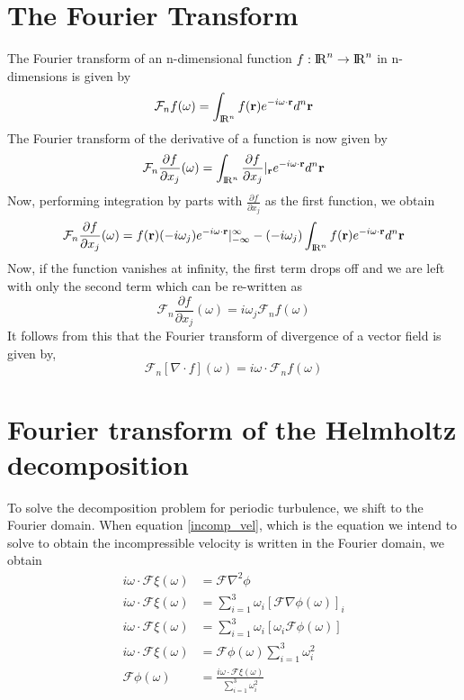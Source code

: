 \documentclass[12pt, a4paper]{report}
\begin{document}
\section{The Fourier Transform}

The Fourier transform of an n-dimensional function $f:{\rm I\!R}^n \rightarrow {\rm I\!R}^n$ in n-dimensions is given by
\begin{equation}
    \mathcal{F}_nf(\omega) = \int_{{\rm I\!R}^n}{f(\mathbf{r})e^{-i\omega\cdot\mathbf{r}}d^n\mathbf{r}}
\end{equation}
The Fourier transform of the derivative of a function is now given by
\begin{equation}
    \mathcal{F}_n\frac{\partial f}{\partial x_j}(\omega) = \int_{{\rm I\!R}^n}{\frac{\partial f}{\partial x_j}|_\mathbf{r} e^{-i\omega\cdot\mathbf{r}}d^n\mathbf{r}}
\end{equation}
Now, performing integration by parts with $\frac{\partial f}{\partial x_j}$ as the first function, we obtain
\begin{equation}
    \mathcal{F}_n\frac{\partial f}{\partial x_j}(\omega) = f(\mathbf{r})(-i\omega_j)e^{-i\omega\cdot\mathbf{r}}|_{-\infty}^{\infty} - (-i\omega_j)\int_{{\rm I\!R}^n}{f(\mathbf{r})e^{-i\omega\cdot\mathbf{r}}d^n\mathbf{r}}
\end{equation}
Now, if the function vanishes at infinity, the first term drops off and we are left with only the second term which can be re-written as
\begin{equation}\label{ft derivative}
    \mathcal{F}_n\frac{\partial f}{\partial x_j}(\omega) = i\omega_j\mathcal{F}_nf(\omega)
\end{equation}
It follows from this that the Fourier transform of divergence of a vector field is given by,
\begin{equation}
    \mathcal{F}_n[\nabla\cdot{f}](\omega) = i\omega\cdot\mathcal{F}_nf(\omega)
\end{equation}

\section{Fourier transform of the Helmholtz decomposition}
To solve the decomposition problem for periodic turbulence, we shift to the Fourier domain. When equation \ref{incomp_vel}, which is the equation we intend to solve to obtain the incompressible velocity is written in the Fourier domain, we obtain
\begin{align}
     i\omega\cdot\mathcal{F}\xi(\omega) &= \mathcal{F}\nabla^2\phi\\
     i\omega\cdot\mathcal{F}\xi(\omega) &= \sum_{i=1}^3{\omega_i[\mathcal{F}\nabla\phi(\omega)]_i}\\
     i\omega\cdot\mathcal{F}\xi(\omega) &= \sum_{i=1}^3{\omega_i[\omega_i\mathcal{F}\phi(\omega)]}\\
     i\omega\cdot\mathcal{F}\xi(\omega) &= \mathcal{F}\phi(\omega)\sum_{i=1}^3{\omega_i^2}\\
     \mathcal{F}\phi(\omega) &= \frac{i\omega\cdot\mathcal{F}\xi(\omega)}{\sum_{i=1}^3{\omega_i^2}}
\end{align}
\end{document}
